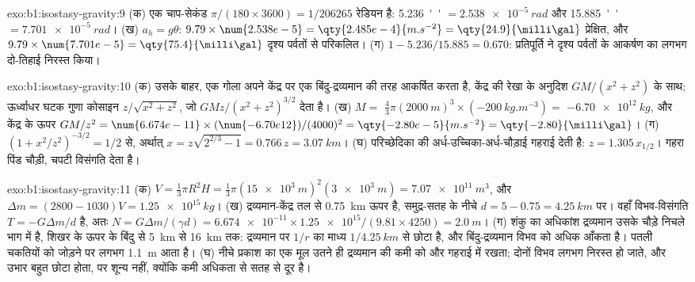 \begin{solution}{exo:b1:isostasy-gravity:9}
(क) एक चाप-सेकंड $\pi/(180\times3600) = 1/\num{206265}$ रेडियन है:
\qty{5.236}{''} $= \qty{2.538e-5}{rad}$ और \qty{15.885}{''} $=
\qty{7.701e-5}{rad}$। (ख) $a_h = g\theta$: $9.79\times\num{2.538e-5} =
\qty{2.485e-4}{m.s^{-2}} = \qty{24.9}{\milli\gal}$ प्रेक्षित, और
$9.79\times\num{7.701e-5} = \qty{75.4}{\milli\gal}$ दृश्य पर्वतों से परिकलित। (ग) $1 - 5.236/15.885 = 0.670$: प्रतिपूर्ति ने दृश्य पर्वतों के आकर्षण का लगभग दो-तिहाई निरस्त किया।
\end{solution}

\begin{solution}{exo:b1:isostasy-gravity:10}
(क) उसके बाहर, एक गोला अपने केंद्र पर एक बिंदु-द्रव्यमान की तरह आकर्षित करता है, केंद्र की रेखा के अनुदिश $GM/(x^2 + z^2)$ के साथ; ऊर्ध्वाधर घटक गुणा कोसाइन $z/\sqrt{x^2 + z^2}$, जो $GMz/(x^2 + z^2)^{3/2}$ देता है। (ख) $M =$ $\tfrac43\pi(\qty{2000}{m})^3\times(\qty{-200}{kg.m^{-3}}) =$
$\qty{-6.70e12}{kg}$, और केंद्र के ऊपर $GM/z^2 = \num{6.674e-11}\times
(\num{-6.70e12})/(4000)^2 = \qty{-2.80e-5}{m.s^{-2}} = \qty{-2.80}{\milli\gal}$। (ग) $(1 + x^2/z^2)^{-3/2} = 1/2$ से, अर्थात् $x = z\sqrt{2^{2/3} - 1} = 0.766\,z =
\qty{3.07}{km}$। (घ) परिच्छेदिका की अर्ध-उच्चिका-अर्ध-चौड़ाई गहराई देती है: $z = 1.305\,x_{1/2}$। गहरा पिंड चौड़ी, चपटी विसंगति देता है।
\end{solution}

\begin{solution}{exo:b1:isostasy-gravity:11}
(क) $V = \tfrac13\pi R^2 H = \tfrac13\pi(\qty{15e3}{m})^2(\qty{3e3}{m}) =
\qty{7.07e11}{m^3}$, और $\Delta m = (2800 - 1030)V = \qty{1.25e15}{kg}$।
(ख) द्रव्यमान-केंद्र तल से \qty{0.75}{km} ऊपर है, समुद्र-सतह के नीचे $d = 5 - 0.75 = \qty{4.25}{km}$ पर। वहाँ विभव-विसंगति $T = -G\Delta m/d$ है, अतः $N = G\Delta m/(\gamma d) =
\num{6.674e-11}\times\num{1.25e15}/(9.81\times4250) = \qty{2.0}{m}$।
(ग) शंकु का अधिकांश द्रव्यमान उसके चौड़े निचले भाग में है, शिखर के ऊपर के बिंदु से \qty{5}{km} से \qty{16}{km} तक: द्रव्यमान पर $1/r$ का माध्य $1/\qty{4.25}{km}$ से छोटा है, और बिंदु-द्रव्यमान विभव को अधिक आँकता है। पतली चकतियों को जोड़ने पर लगभग \qty{1.1}{m} आता है।
(घ) नीचे प्रकाश  का एक मूल उतने ही द्रव्यमान की कमी को और गहराई में रखता; दोनों विभव लगभग निरस्त हो जाते, और उभार बहुत छोटा होता, पर शून्य नहीं, क्योंकि कमी अधिकता से सतह से दूर है।
\end{solution}

